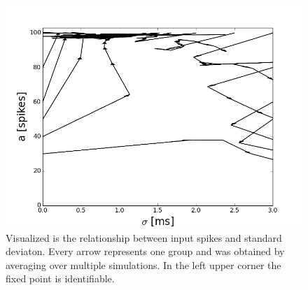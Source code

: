 \documentclass[12pt,a4paper, bibliography=totoc, listof=numbered, footexclude]{scrartcl}
\begin{document}
	  \begin{figure}
	\centering
	\includegraphics[width=0.92\linewidth]{./Plots/Our_Plots/Phase_plane}
	\caption{Visualized is the relationship between input spikes and standard deviaton. Every arrow represents one group and was obtained by averaging over multiple simulations. In the left upper corner the fixed point is identifiable.}
	\label{fig:Phase_plane}
	\end{figure}
\end{document}
